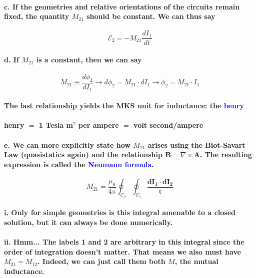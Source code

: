 \documentclass{article}
\begin{document}
\paragraph{\indent c. If the geometries and relative orientations of the circuits remain fixed, the quantity $M_{21}$ should be constant. We can thus say}
\begin{equation*}
    \mathcal{E}_2=-M_{21}\frac{dI_1}{dt}
\end{equation*}
\paragraph{\indent d. If $M_{21}$ is a constant, then we can say}
\begin{equation*}
    M_{21}\equiv\frac{d\phi_2}{dI_1}\rightarrow d\phi_2=M_{21}\cdot dI_1\rightarrow \phi_2=M_{21}\cdot I_1
\end{equation*}
\paragraph{The last relationship yields the MKS unit for inductance: the \textcolor{blue}{henry}}
\paragraph{ henry $=$ 1 Tesla m$^2$ per ampere $=$ volt second/ampere}
\paragraph{\indent e. We can more explicitly state how $M_{21}$ arises using the Biot-Savart Law (quasistatics again) and the relationship $\boldsymbol{B}=\nabla\times\boldsymbol{A}$. The resulting expression is called the \textcolor{blue}{Neumann formula}.}
\begin{equation*}
    M_{21}=\frac{\mu_0}{4\pi}\oint_{C_2}\oint_{C_1}\frac{\boldsymbol{dI_1}\cdot\boldsymbol{dI_2}}{\mathfrak{r}}
\end{equation*}
\paragraph{\indent\indent i. Only for simple geometries is this integral amenable to a closed solution, but it can always be done numerically.}
\paragraph{\indent\indent ii. Hmm... The labels 1 and 2 are arbitrary in this integral since the order of integration doesn't matter. That means we also must have $M_{21}=M_{12}$. Indeed, we can just call them both $M$, the mutual inductance.}
\end{document}
